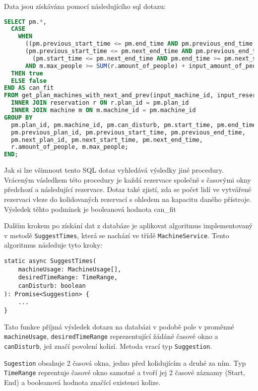 Data jsou získávána pomocí následujícího sql dotazu:
\begin{lstlisting}[language=SQL]
SELECT pm.*,
  CASE
    WHEN
      ((pm.previous_start_time <= pm.end_time AND pm.previous_end_time >= pm.start_time) OR
      (pm.previous_start_time <= pm.next_end_time AND pm.previous_end_time >= pm.next_start_time) OR
        (pm.start_time <= pm.next_end_time AND pm.end_time >= pm.next_start_time))
      AND m.max_people >= SUM(r.amount_of_people) + input_amount_of_people
  THEN true
  ELSE false
END AS can_fit
FROM get_plan_machines_with_next_and_prev(input_machine_id, input_reservation_date) pm
  INNER JOIN reservation r ON r.plan_id = pm.plan_id
  INNER JOIN machine m ON m.machine_id = pm.machine_id
GROUP BY
  pm.plan_id, pm.machine_id, pm.can_disturb, pm.start_time, pm.end_time,
  pm.previous_plan_id, pm.previous_start_time, pm.previous_end_time,
  pm.next_plan_id, pm.next_start_time, pm.next_end_time,
  r.amount_of_people, m.max_people;
END;
\end{lstlisting}
Jak si lze všimnout tento SQL dotaz vyhledává výsledky jiné procedury. Vráceným vásledkem této procedury je každá rezervace společně s časovými okny předchozí a následující rezervace.
Dotaz také zjistí, zda se počet lidí ve vytvářené rezervaci vleze do kolidovaných rezervací s ohledem na kapacitu daného přístroje. Výsledek těhto podmínek je booleanová hodnota can\_fit

Dalším krokem po získání dat z databáze je aplikovat algoritmus implementovaný v metodě \texttt{SuggestTimes}, která se nachází ve třídě \texttt{MachineService}. Tento algoritmus následuje tyto kroky:

\begin{lstlisting}
static async SuggestTimes(
    machineUsage: MachineUsage[],
    desiredTimeRange: TimeRange,
    canDisturb: boolean
): Promise<Suggestion> {
    ...
}
\end{lstlisting}

Tato funkce příjmá výsledek dotazu na databázi v podobě pole v proměnné \texttt{machineUsage}, \texttt{desiredTimeRange} reprezentující žádáné časové okno a \texttt{canDisturb}, jež značí povolení kolizí. Metoda vrací typ \texttt{Suggestion}.

\texttt{Sugestion} obsahuje 2 časová okna, jedno před kolidujícím a druhé za ním. Typ \texttt{TimeRange} reprentuje časové okno samotné a tvoří jej 2 časové záznamy (Start, End) a booleanová hodnota značící existenci kolize.

